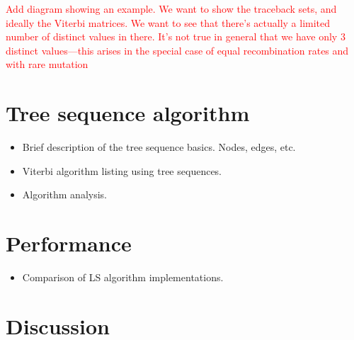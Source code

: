 \documentclass{article}
\begin{document}
\textcolor{red}{Add diagram showing an example. We want to show the
traceback sets, and ideally the Viterbi matrices. We want to see that
there's actually a limited number of distinct values in there.
It's not true in general that we have only 3 distinct values---this arises
in the special case of equal recombination rates and with rare mutation}

\section{Tree sequence algorithm}

\begin{itemize}
\item Brief description of the tree sequence basics. Nodes, edges, etc.
\item Viterbi algorithm listing using tree sequences.
\item Algorithm analysis.
\end{itemize}

\section{Performance}

\begin{itemize}
\item Comparison of LS algorithm implementations.
\end{itemize}


\section{Discussion}


\end{document}
